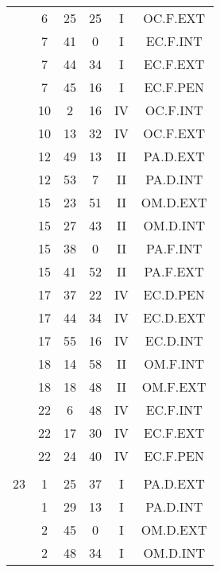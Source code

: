 \documentclass[12pt, a4paper]{article}
\begin{document}
\begin{multicols}{3}
{\begin{tabular}{c c c c c c}
	 	 	 	 & 6 & 25 & 25 & I & OC.F.EXT\\%
	 	 	 	 & 7 & 41 & 0 & I & EC.F.INT\\%
	 	 	 	 & 7 & 44 & 34 & I & EC.F.EXT\\%
	 	 	 	 & 7 & 45 & 16 & I & EC.F.PEN\\%
	 	 	 	 & 10 & 2 & 16 & IV & OC.F.INT\\%
	 	 	 	 & 10 & 13 & 32 & IV & OC.F.EXT\\%
	 	 	 	 & 12 & 49 & 13 & II & PA.D.EXT\\%
	 	 	 	 & 12 & 53 & 7 & II & PA.D.INT\\%
	 	 	 	 & 15 & 23 & 51 & II & OM.D.EXT\\%
	 	 	 	 & 15 & 27 & 43 & II & OM.D.INT\\%
	 	 	 	 & 15 & 38 & 0 & II & PA.F.INT\\%
	 	 	 	 & 15 & 41 & 52 & II & PA.F.EXT\\%
	 	 	 	 & 17 & 37 & 22 & IV & EC.D.PEN\\%
	 	 	 	 & 17 & 44 & 34 & IV & EC.D.EXT\\%
	 	 	 	 & 17 & 55 & 16 & IV & EC.D.INT\\%
	 	 	 	 & 18 & 14 & 58 & II & OM.F.INT\\%
	 	 	 	 & 18 & 18 & 48 & II & OM.F.EXT\\%
	 	 	 	 & 22 & 6 & 48 & IV & EC.F.INT\\%
	 	 	 	 & 22 & 17 & 30 & IV & EC.F.EXT\\%
	 	 	 	 & 22 & 24 & 40 & IV & EC.F.PEN\\%
	 	 	 	 & & & & & \\%
	 	 	 	23 & 1 & 25 & 37 & I & PA.D.EXT\\%
	 	 	 	 & 1 & 29 & 13 & I & PA.D.INT\\%
	 	 	 	 & 2 & 45 & 0 & I & OM.D.EXT\\%
	 	 	 	 & 2 & 48 & 34 & I & OM.D.INT\\%
	 	 \end{tabular}
 	}
\end{multicols}
\end{document}
